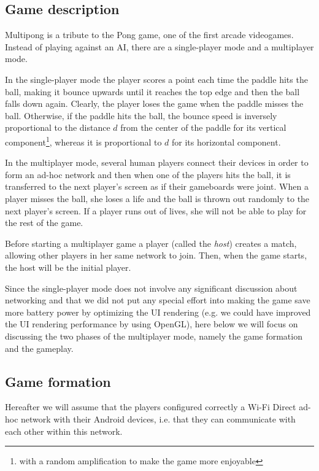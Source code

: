 \subsection{Game description} %

Multipong is a tribute to the Pong game, one of the first arcade videogames.
Instead of playing against an AI, there are a single-player mode and a
multiplayer mode.

In the single-player mode the player scores a point each time the paddle hits
the ball, making it bounce upwards until it reaches the top edge and then the
ball falls down again. Clearly, the player loses the game when the paddle
misses the ball.
%
%
%
%
%
Otherwise, if the paddle hits the ball, the bounce speed is inversely
proportional to the distance $d$ from the center of the paddle for its
vertical component\footnote{with a random amplification to make the game more
enjoyable}, whereas it is proportional to $d$ for its horizontal component.

In the multiplayer mode, several human players connect their devices in order
to form an ad-hoc network and then when one of the players hits the ball, it is
transferred to the next player's screen as if their gameboards were joint.
When a player misses the ball, she loses a life and the ball is thrown out
randomly to the next player's screen.
If a player runs out of lives, she will not be able to play for the rest of the
game.

Before starting a multiplayer game a player (called the \textit{host}) creates
a match, allowing other players in her same network to join. Then, when the
game starts, the host will be the initial player.

Since the single-player mode does not involve any significant discussion about
networking and that we did not put any special effort into making the game save
more battery power by optimizing the UI rendering (e.g. we could have improved
the UI rendering performance by using OpenGL), here below we will focus on
discussing the two phases of the multiplayer mode, namely the game formation
and the gameplay.

\subsection{Game formation}

Hereafter we will assume that the players configured correctly a Wi-Fi Direct
ad-hoc network with their Android devices, i.e. that they can communicate with
each other within this network.

